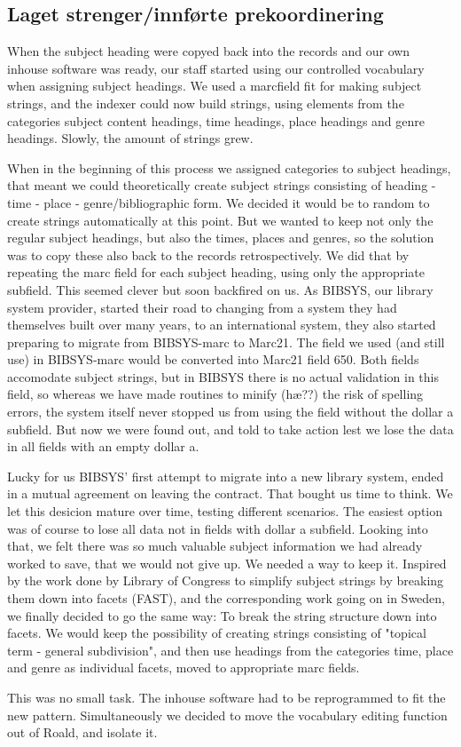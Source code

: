 \subsection{Laget strenger/innførte prekoordinering}
When the subject heading were copyed back into the records and our own inhouse software was ready, our staff started using our controlled vocabulary when assigning subject headings. We used a marcfield fit for making subject strings, and the indexer could now build strings, using elements from the categories subject content headings, time headings, place headings and genre headings. Slowly, the amount of strings grew. 

When in the beginning of this process we assigned categories to subject headings, that meant we could theoretically create subject strings consisting of heading - time - place - genre/bibliographic form. We decided it would be to random to create strings automatically at this point. But we wanted to keep not only the regular subject headings, but also the times, places and genres, so the solution was to copy these also back to the records retrospectively. We did that by repeating the marc field for each subject heading, using only the appropriate subfield. This seemed clever but soon backfired on us. As BIBSYS, our library system provider, started their road to changing from a system they had themselves built over many years, to an international system, they also started preparing to migrate from BIBSYS-marc to Marc21. The field we used (and still use) in BIBSYS-marc would be converted into Marc21 field 650. Both fields accomodate subject strings, but in BIBSYS there is no actual validation in this field, so whereas we have made routines to minify (hæ??) the risk of spelling errors, the system itself never stopped us from using the field without the dollar a subfield. But now we were found out, and told to take action lest we lose the data in all fields with an empty dollar a. 

Lucky for us BIBSYS' first attempt to migrate into a new library system, ended in a mutual agreement on leaving the contract. That bought us time to think. We let this desicion mature over time, testing different scenarios. The easiest option was of course to lose all data not in fields with dollar a subfield. Looking into that, we felt there was so much valuable subject information we had already worked to save, that we would not give up. We needed a way to keep it. Inspired by the work done by Library of Congress to simplify subject strings by breaking them down into facets (FAST), and the corresponding work going on in Sweden, we finally decided to go the same way: To break the string structure down into facets. We would keep the possibility of creating strings consisting of "topical term - general subdivision", and then use headings from the categories time, place and genre as individual facets, moved to appropriate marc fields. 

This was no small task. The inhouse software had to be reprogrammed to fit the new pattern. Simultaneously we decided to move the vocabulary editing function out of Roald, and isolate it. 